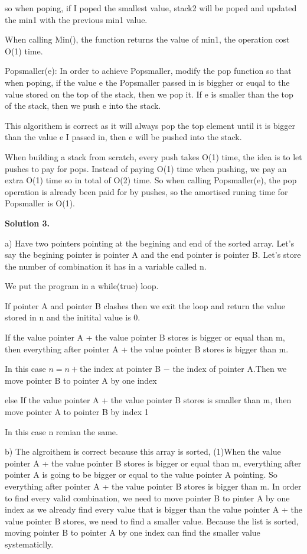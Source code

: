 \documentclass[12pt]{article}
\newcommand{\solution}[1]{\noindent \textbf{Solution #1.}}
\begin{document}
so when poping, if I poped the smallest value, stack2 will be poped and updated the min1 with the previous min1 value.

When calling Min(), the function returns the value of min1, the operation cost O(1) time.

Popsmaller(e): In order to achieve Popsmaller, modify the pop function so that when poping, if the value e the Popsmaller passed in is biggher or euqal to the value stored on the top of the stack, 
then we pop it. If  e is smaller than the top of the stack, then we push e into the stack. 

This algorithem is correct as it will always pop the top element until it is bigger than the value e I passed in, then e will be pushed into the stack.

When building a stack from scratch, every push takes O(1) time, the idea is to let pushes to pay for pops. Instead of paying O(1) time when pushing,
we pay an extra O(1) time so in total of O(2) time. So when calling Popsmaller(e), the pop operation is already been paid for by pushes, so the amortised runing time
for Popsmaller is O(1).

\solution{3} 

a) Have two pointers pointing at the begining and end of the sorted array. Let's say the begining pointer is pointer A and the end pointer is pointer B. 
Let's store the number of combination it has in a variable called n.

We put the program in a while(true) loop.

If pointer A and pointer B clashes then we exit the loop and return the value stored in n and the initital value is 0.

If the value pointer A + the value pointer B stores is bigger or equal than m, then everything after pointer A + the value pointer B stores is bigger than m. 

In this case \(n = n+\)the index at pointer B \(-\) the index of pointer A.Then we move pointer B to pointer A by one index

else If the value pointer A + the value pointer B stores is smaller than m, then move pointer A to pointer B by index 1

In this case n remian the same.

b) The algroithem is correct because this array is sorted, 
(1)When the value pointer A + the value pointer B stores is bigger or equal than m, everything after pointer A is going to be bigger or equal to the value pointer A pointing.
So everything after pointer A + the value pointer B stores is bigger than m.
In order to find every valid combination, we need to move pointer B to pinter A by one index as we already find every value that is bigger than the value pointer A + the value pointer B stores,
we need to find a smaller value. Because the list is sorted, moving pointer B to pointer A by one index can find the smaller value systematiclly.
\end{document}
